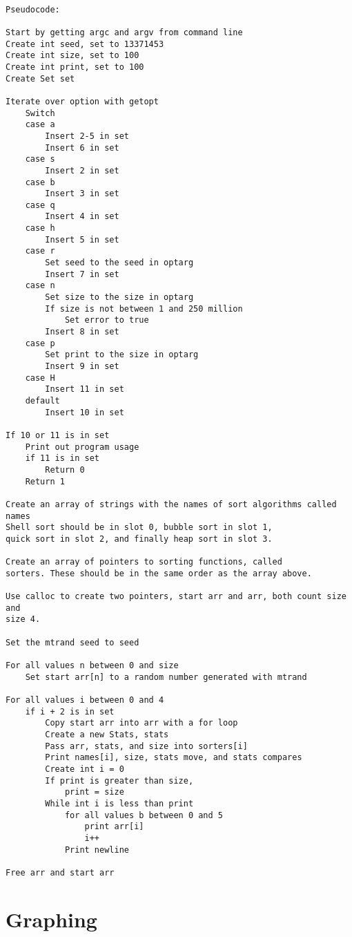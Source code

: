 \documentclass[11pt]{article}
\begin{document}
\begin{verbatim}

Pseudocode:

Start by getting argc and argv from command line
Create int seed, set to 13371453
Create int size, set to 100
Create int print, set to 100
Create Set set

Iterate over option with getopt
    Switch
    case a
        Insert 2-5 in set
        Insert 6 in set
    case s
        Insert 2 in set
    case b
        Insert 3 in set
    case q
        Insert 4 in set
    case h
        Insert 5 in set
    case r
        Set seed to the seed in optarg
        Insert 7 in set
    case n
        Set size to the size in optarg
        If size is not between 1 and 250 million
            Set error to true
        Insert 8 in set
    case p
        Set print to the size in optarg
        Insert 9 in set
    case H
        Insert 11 in set
    default
        Insert 10 in set

If 10 or 11 is in set 
    Print out program usage
    if 11 is in set
        Return 0
    Return 1

Create an array of strings with the names of sort algorithms called names
Shell sort should be in slot 0, bubble sort in slot 1,
quick sort in slot 2, and finally heap sort in slot 3.

Create an array of pointers to sorting functions, called
sorters. These should be in the same order as the array above.

Use calloc to create two pointers, start arr and arr, both count size and
size 4.

Set the mtrand seed to seed

For all values n between 0 and size
    Set start arr[n] to a random number generated with mtrand

For all values i between 0 and 4
    if i + 2 is in set
        Copy start arr into arr with a for loop
        Create a new Stats, stats
        Pass arr, stats, and size into sorters[i]
        Print names[i], size, stats move, and stats compares
        Create int i = 0
        If print is greater than size,
            print = size
        While int i is less than print
            for all values b between 0 and 5
                print arr[i]
                i++
            Print newline

Free arr and start arr

\end{verbatim}

\section{Graphing}
\end{document}
